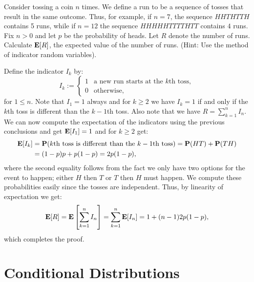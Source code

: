 \documentclass[11pt,a4paper]{article}
\begin{document}
\begin{exercise}
  Consider tossing a coin $n$ times.
  We define a run to be a sequence of tosses that result in the same outcome.
  Thus, for example, if $n = 7$, the sequence $HHTHTTH$ contains 5 runs,
  while if $n = 12$ the sequence $HHHHHTTTTHTT$ contains $4$ runs.
  Fix $n > 0$ and let $p$ be the probability of heads.
  Let $R$ denote the number of runs.
  Calculate $\mathbf{E}[R]$, the expected value of the number of runs.
  (Hint: Use the method of indicator random variables).
\end{exercise}
\begin{solution}
  Define the indicator $I_k$ by:
  \[
    I_k :=
    \begin{cases}
      1 &\text{a new run starts at the $k$th toss}, \\
      0 &\text{otherwise},
    \end{cases}
  \]
  for $1 \le n$.
  Note that $I_1 = 1$ always and for $k \geq 2$ we have $I_k = 1$ if 
  and only if the $k$th toss is different than the $k-1$th toss.
  Also note that we have $R = \sum_{k=1}^{n} I_n$.
  We can now compute the expectation of the indicators
  using the previous conclusions and get $\mathbf{E}[I_1] = 1$
  and for $k \geq 2$ get:
  \begin{align*}
    \mathbf{E}[I_k] &=
    \mathbf{P}(\text{$k$th toss is different than the $k-1$th toss}) =
    \mathbf{P}(HT) + \mathbf{P}(TH) \\ &= (1 - p)p + p(1 - p) = 2p(1 - p),
  \end{align*}
  where the second equality follows from the fact we only have two options
  for the event to happen; either $H$ then $T$ or $T$ then $H$ must happen.
  We compute these probabilities easily since the tosses are independent.
  Thus, by linearity of expectation we get:
  \[
    \mathbf{E}[R] =
    \mathbf{E}\left[\sum_{k=1}^{n} I_n\right] =
    \sum_{k=1}^{n} \mathbf{E}[I_n] =
    1 + (n - 1) 2p (1 - p),
  \]
  which completes the proof.
\end{solution}

\newpage

\section{Conditional Distributions}
\end{document}
